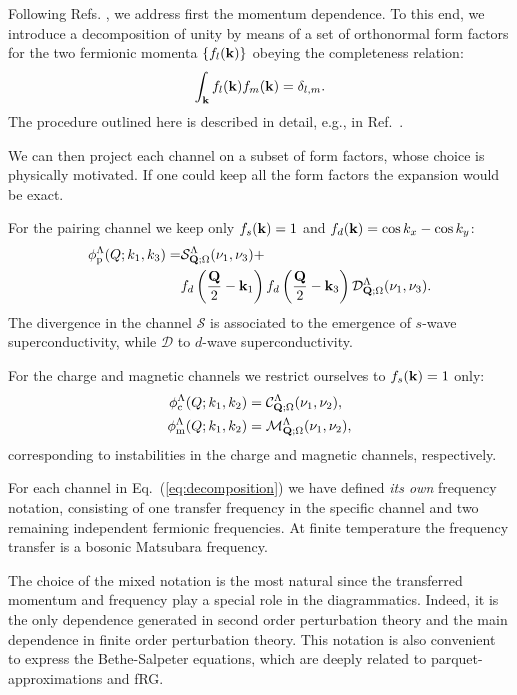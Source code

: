 
Following Refs. , we address first the momentum dependence. To this end, we introduce a decomposition of 
unity by means of a set of orthonormal form factors for the two fermionic momenta $\{f_{l}(\mathbf{k})\}$ obeying 
the completeness relation\cite{Lichtenstein2017}:
\begin{equation}
 \int_{\mathbf{k}}  f_{l}(\mathbf{k}) f_{m}(\mathbf{k}) = \delta_{l,m}.
\end{equation}
The procedure outlined here is described in detail, e.g., in Ref.~.

We can then project each channel on a subset of form factors, whose choice is physically motivated\cite{Husemann2009}. 
If one could keep all the  form factors the expansion would be exact.

For the pairing channel we keep only $f_{s}(\mathbf{k}) = 1$ and $f_d(\mathbf{k})=\cos{k_x} - \cos{k_y}$:
\begin{align}
\nonumber
  \phi^{\Lambda}_{\mathrm{p}}(Q;k_1,k_3) =&
    \mathcal{S}^\Lambda_{\mathbf{Q};\Omega}(\nu_1,\nu_3) +   \\ 
    & f_d\left(\frac{\mathbf{Q}}{2}-\mathbf{k}_1\right) f_d\left(\frac{\mathbf{Q}}{2}-\mathbf{k}_3\right) \mathcal{D}^\Lambda_{\mathbf{Q};\Omega}(\nu_1,\nu_3).
\end{align}
The divergence in the channel $\mathcal{S}$ is associated to the emergence of $s$-wave superconductivity, while $\mathcal{D}$  to $d$-wave superconductivity.\cite{Metzner2012,Platt2013}

For the charge and magnetic channels we restrict ourselves to $f_{s}(\mathbf{k})=1$ only:
\begin{align}
  \phi^\Lambda_{\mathrm{c}}(Q;k_1,k_2) &= \mathcal{C}^\Lambda_{\mathbf{Q};\Omega}(\nu_1,\nu_2), \\
  \phi^\Lambda_{\mathrm{m}}(Q;k_1,k_2) &= \mathcal{M}^\Lambda_{\mathbf{Q};\Omega}(\nu_1,\nu_2),
\end{align}
corresponding to instabilities in the charge and magnetic channels, respectively.

For each channel in Eq.~(\ref{eq:decomposition}) we have defined \textit{its own} frequency notation, consisting of one transfer frequency in the specific channel 
and two remaining independent fermionic frequencies. 
 At finite temperature the frequency transfer is a bosonic Matsubara frequency.
 
 The choice of the mixed notation is the most natural since the transferred momentum and 
frequency play a special role in the diagrammatics.
Indeed, it is the only dependence generated in second order perturbation theory and the main dependence in finite 
order perturbation theory. This notation is also convenient to express the Bethe-Salpeter equations, which are deeply related to parquet-approximations and fRG.

